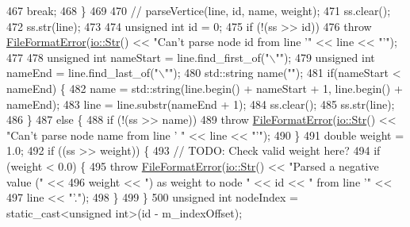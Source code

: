 \begin{DoxyCode}
467             \textcolor{keywordflow}{break};
468         \}
469 
470         \textcolor{comment}{// parseVertice(line, id, name, weight);}
471         ss.clear();
472         ss.str(line);
473 
474         \textcolor{keywordtype}{unsigned} \textcolor{keywordtype}{int} \textcolor{keywordtype}{id} = 0;
475         \textcolor{keywordflow}{if} (!(ss >> \textcolor{keywordtype}{id}))
476             \textcolor{keywordflow}{throw} \mbox{\hyperlink{classFileFormatError}{FileFormatError}}(\mbox{\hyperlink{classio_1_1Str}{io::Str}}() << \textcolor{stringliteral}{"Can't parse node id from line '"} << 
      line << \textcolor{stringliteral}{"'"});
477 
478         \textcolor{keywordtype}{unsigned} \textcolor{keywordtype}{int} nameStart = line.find\_first\_of(\textcolor{stringliteral}{"\(\backslash\)""});
479         \textcolor{keywordtype}{unsigned} \textcolor{keywordtype}{int} nameEnd = line.find\_last\_of(\textcolor{stringliteral}{"\(\backslash\)""});
480         std::string name(\textcolor{stringliteral}{""});
481         \textcolor{keywordflow}{if}(nameStart < nameEnd) \{
482             name = std::string(line.begin() + nameStart + 1, line.begin() + nameEnd);
483             line = line.substr(nameEnd + 1);
484             ss.clear();
485             ss.str(line);
486         \}
487         \textcolor{keywordflow}{else} \{
488             \textcolor{keywordflow}{if} (!(ss >> name))
489                 \textcolor{keywordflow}{throw} \mbox{\hyperlink{classFileFormatError}{FileFormatError}}(\mbox{\hyperlink{classio_1_1Str}{io::Str}}() << \textcolor{stringliteral}{"Can't parse node name from line '
      "} << line << \textcolor{stringliteral}{"'"});
490         \}
491         \textcolor{keywordtype}{double} weight = 1.0;
492         \textcolor{keywordflow}{if} ((ss >> weight)) \{
493             \textcolor{comment}{// TODO: Check valid weight here?}
494             \textcolor{keywordflow}{if} (weight < 0.0) \{
495                 \textcolor{keywordflow}{throw} \mbox{\hyperlink{classFileFormatError}{FileFormatError}}(\mbox{\hyperlink{classio_1_1Str}{io::Str}}() << \textcolor{stringliteral}{"Parsed a negative value ("} <<
496                 weight << \textcolor{stringliteral}{") as weight to node "} << \textcolor{keywordtype}{id} << \textcolor{stringliteral}{" from line '"} <<
497                 line << \textcolor{stringliteral}{"'."});
498             \}
499         \}
500         \textcolor{keywordtype}{unsigned} \textcolor{keywordtype}{int} nodeIndex = \textcolor{keyword}{static\_cast<}\textcolor{keywordtype}{unsigned} \textcolor{keywordtype}{int}\textcolor{keyword}{>}(\textcolor{keywordtype}{id} - m\_indexOffset);

\end{DoxyCode}

